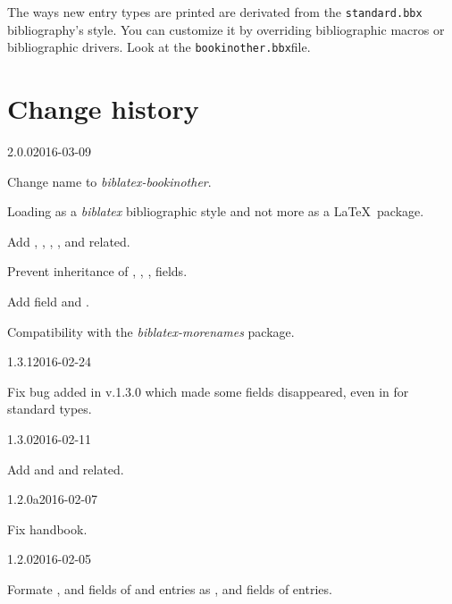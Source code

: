 \documentclass{ltxdockit}[2011/03/25]
\newcommand{\biblatex}{\emph{biblatex}\xspace}
\begin{document}
The ways new entry types are printed are derivated from the \verb+standard.bbx+ bibliography's style. You can customize it by overriding bibliographic macros or bibliographic drivers. Look at the \verb+bookinother.bbx+file.

\section{Change history}


\begin{changelog}

\begin{release}{2.0.0}{2016-03-09}
\item Change name to \emph{biblatex-bookinother}.
\item Loading as a \biblatex bibliographic style and not more as a \LaTeX\ package.
\item Add , , , ,  and related.
\item Prevent inheritance of , , ,  fields.
\item Add field  and .
\item Compatibility with the \emph{biblatex-morenames} package.
\end{release}

\begin{release}{1.3.1}{2016-02-24}
\item Fix bug added in v.1.3.0 which made some fields disappeared, even in for standard types.
\end{release}

\begin{release}{1.3.0}{2016-02-11}
\item Add  and  and related.
\end{release}

\begin{release}{1.2.0a}{2016-02-07}
\item Fix handbook.
\end{release}

\begin{release}{1.2.0}{2016-02-05}
\item Formate   ,  and  fields of   and  entries as ,  and  fields of  entries.
\end{release}


\end{changelog}
\end{document}
